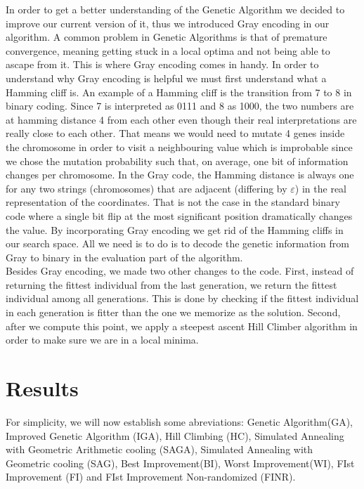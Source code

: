 \documentclass{article}
\begin{document}
In order to get a better understanding of the Genetic Algorithm we decided to improve our current version of it, thus we introduced Gray encoding in our algorithm. A common problem in Genetic Algorithms is that of premature convergence, meaning getting stuck in a local optima and not being able to ascape from it. This is where Gray encoding comes in handy. In order to understand why Gray encoding is helpful we must first understand what a Hamming cliff is. An example of a Hamming cliff is the transition from 7 to 8 in binary coding. Since 7 is interpreted as 0111 and 8 as 1000, the two numbers are at hamming distance 4 from each other even though their real interpretations are really close to each other. That means we would need to mutate 4 genes inside the chromosome in order to visit a neighbouring value which is improbable since we chose the mutation probability such that, on average, one bit of information changes per chromosome. In the Gray code, the Hamming distance is always one for any two strings (chromosomes) that are adjacent (differing by $\varepsilon$) in the real representation of the coordinates. That is not the case in the standard binary code where a single bit flip at the most significant position dramatically changes the value. By incorporating Gray encoding we get rid of the Hamming cliffs in our search space. All we need is to do is to decode the genetic information from Gray to binary in the evaluation part of the algorithm. \\
Besides Gray encoding, we made two other changes to the code. First, instead of returning the fittest individual from the last generation, we return the fittest individual among all generations. This is done by checking if the fittest individual in each generation is fitter than the one we memorize as the solution. Second, after we compute this point, we apply a steepest ascent Hill Climber algorithm in order to make sure we are in a local minima.

\section{Results}

For simplicity, we will now establish some abreviations: Genetic Algorithm(GA), Improved Genetic Algorithm (IGA),  Hill Climbing (HC), Simulated Annealing with Geometric Arithmetic cooling (SAGA), Simulated Annealing with Geometric cooling (SAG), Best Improvement(BI), Worst Improvement(WI), FIst Improvement (FI) and FIst Improvement Non-randomized (FINR). \\
\end{document}
